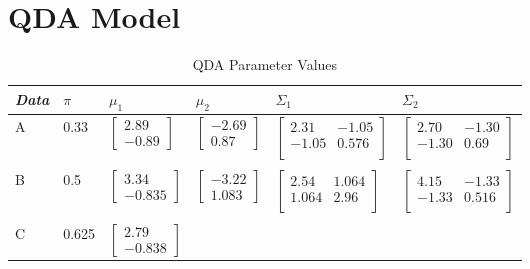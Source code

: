 \documentclass[paper=a4, fontsize=11pt]{scrartcl} %
\numberwithin{equation}{section} %
\numberwithin{figure}{section} %
\numberwithin{table}{section} %
\begin{document}
\section{QDA Model}

	\begin{table}
		\caption {QDA Parameter Values} \label{tab:title} 
		\begin{center}		
			\begin{tabular}{*6l}   
				\toprule
				\emph{Data}&  $\pi$ & $\mu_1$  & $\mu_2$ & $\Sigma_1$ & $\Sigma_2$ \\\midrule
				A & 0.33 
				& $\begin{bmatrix}2.89 \\ -0.89\end{bmatrix}$ 
				& $\begin{bmatrix}-2.69 \\ 0.87\end{bmatrix}$ 
				& $\begin{bmatrix}
				2.31 & -1.05 \\
				-1.05 & 0.576 \\ \end{bmatrix}$
				& $\begin{bmatrix}
				2.70 & -1.30 \\
				-1.30 & 0.69 \\ \end{bmatrix}$			
				\\ \\
				B & 0.5 
				& $\begin{bmatrix}3.34 \\ -0.835\end{bmatrix}$ 
				& $\begin{bmatrix}-3.22 \\ 1.083\end{bmatrix}$ 
				& $\begin{bmatrix}
				2.54 & 1.064 \\
				1.064 & 2.96 \\ \end{bmatrix}$
				& $\begin{bmatrix}
				4.15 & -1.33 \\
				-1.33 & 0.516 \\ \end{bmatrix}$			
				\\ \\
				C & 0.625
				& $\begin{bmatrix}2.79 \\ -0.838\end{bmatrix}$ 

\end{tabular}
\end{center}
\end{table}
\end{document}
